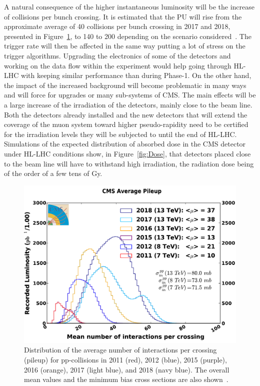 	A natural consequence of the higher instantaneous luminosity will be the increase of collisions per bunch crossing. It is estimated that the \acl{PU} will rise from the approximate average of 40 collisions per bunch crossing in 2017 and 2018, presented in Figure~\ref{fig:CMS-pileup}, to 140 to 200 depending on the scenario considered~\cite{MEDINAMEDRANO2017}. The trigger rate will then be affected in the same way putting a lot of stress on the trigger algorithms. Upgrading the electronics of some of the detectors and working on the data flow within the experiment would help going through HL-LHC with keeping similar performance than during Phase-1. On the other hand, the impact of the increased background will become problematic in many ways and will force for upgrades or many sub-systems of CMS. The main effects will be a large increase of the irradiation of the detectors, mainly close to the beam line. Both the detectors already installed and the new detectors that will extend the coverage of the muon system toward higher pseudo-rapidity need to be certified for the irradiation levels they will be subjected to until the end of HL-LHC. Simulations of the expected distribution of absorbed dose in the CMS detector under HL-LHC conditions show, in Figure~\ref{fig:Dose}, that detectors placed close to the beam line will have to withstand high irradiation, the radiation dose being of the order of a few tens of \si{Gy}.
	
\begingroup\setlength{\intextsep}{5pt}\setlength{\columnsep}{15pt}

	\begin{figure}
		\centering
		\includegraphics[width=\linewidth]{fig/chapt3/CMS_pileup_pp_2018.pdf}
		\caption{\label{fig:CMS-pileup} Distribution of the average number of interactions per crossing (pileup) for pp-collisions in 2011 (red), 2012 (blue), 2015 (purple), 2016 (orange), 2017 (light blue), and 2018 (navy blue). The overall mean values and the minimum bias cross sections are also shown~\cite{LUMIPUBLICCMS}.}
	\end{figure}

